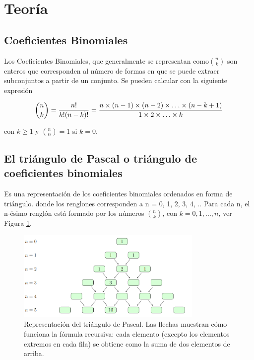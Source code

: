 \documentclass[12pt]{article}
\begin{document}
	
\par
\bigskip
{}\par
\noindent\hrulefill

\section{Teoría}

\subsection{Coeficientes Binomiales}

 Los Coeficientes Binomiales, que generalmente se representan como${n\choose k}$ son enteros que corresponden al número de formas en que se puede extraer subconjuntos a partir de un conjunto. Se pueden calcular con la siguiente expresión

\begin{equation}
{n\choose k} = {n!\over k!(n-k)!}
  = {n\times(n-1)\times(n-2)\times\ldots\times(n-k+1)\over
     1\times2\times\ldots\times k}
\end{equation}\label{Equa1}

con $k\ge1$ y ${n\choose0}=1$ si $k=0$.

\subsection{El triángulo de Pascal o triángulo de coeficientes binomiales}

Es una representación de los coeficientes binomiales ordenados en forma de triángulo. donde los renglones corresponden a n = 0, 1, 2, 3, 4, .. Para cada n, el n-ésimo renglón está formado por los números ${n\choose k}$, con $k = 0, 1, . . . , n$, ver Figura \ref{fig:pascal}.

\begin{figure}
	\centering
	\includegraphics[width=0.8\textwidth]{Pascal.png} 
	\caption{Representación del triángulo de Pascal. Las flechas muestran cómo funciona la fórmula recursiva: cada elemento (excepto los elementos extremos en cada fila) se obtiene como la suma de dos elementos de arriba.}
	\label{fig:pascal}
\end{figure}
\end{document}
